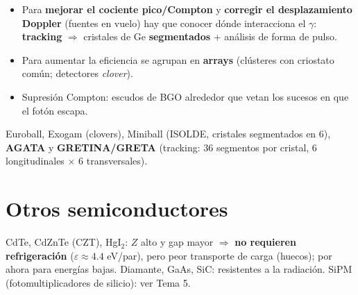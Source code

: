 \begin{clave}
\begin{itemize}
\item Para \textbf{mejorar el cociente pico/Compton} y \textbf{corregir el desplazamiento Doppler} (fuentes en vuelo) hay que conocer
dónde interacciona el $\gamma$: \textbf{tracking} $\Rightarrow$ cristales de Ge \textbf{segmentados} + análisis de forma de pulso.
\item Para aumentar la eficiencia se agrupan en \textbf{arrays} (clústeres con criostato común; detectores \emph{clover}).
\item Supresión Compton: escudos de BGO alrededor que vetan los sucesos en que el fotón escapa.
\end{itemize}
\end{clave}
\begin{dato}[Ejemplos]
Euroball, Exogam (clovers), Miniball (ISOLDE, cristales segmentados en 6), \textbf{AGATA} y \textbf{GRETINA/GRETA}
(tracking: 36 segmentos por cristal, 6 longitudinales $\times$ 6 transversales).
\end{dato}

\section{Otros semiconductores}
CdTe, CdZnTe (CZT), HgI$_2$: $Z$ alto y gap mayor $\Rightarrow$ \textbf{no requieren refrigeración} ($\varepsilon\approx4.4$ eV/par),
pero peor transporte de carga (huecos); por ahora para energías bajas. Diamante, GaAs, SiC: resistentes a la radiación.
SiPM (fotomultiplicadores de silicio): ver Tema 5.
